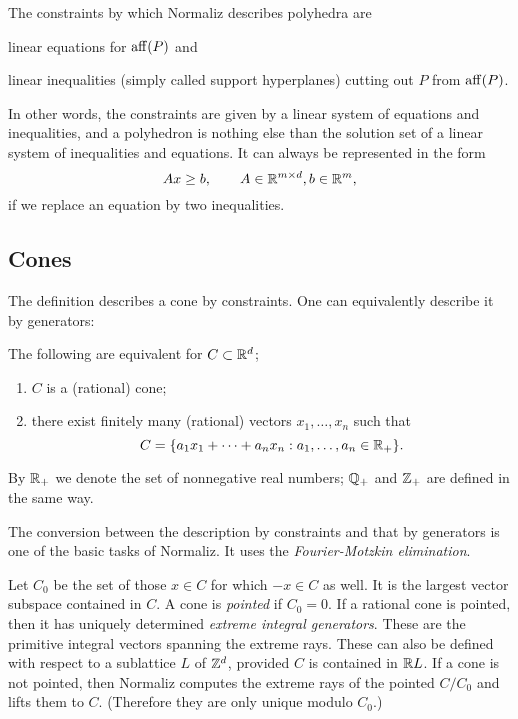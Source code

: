 The constraints by which Normaliz describes polyhedra are
\begin{arab}
	\item linear equations for $\operatorname{aff}(P)$ and
	\item linear inequalities (simply called support hyperplanes) cutting out $P$ from $\operatorname{aff}(P)$.
\end{arab}
In other words, the constraints are given by a linear system of equations and inequalities, and a polyhedron is nothing else than the solution set of a linear system of inequalities and equations. It can always be represented in the form
$$
Ax\ge b, \qquad A\in{\mathbb R}^{m\times d}, b\in {\mathbb R}^m,
$$
if we replace an equation by two inequalities.

\subsection{Cones}

The definition describes a cone by constraints. One can equivalently describe it by generators:

\begin{theorem}
	The following are equivalent for $C\subset{\mathbb R}^d$;
	\begin{enumerate}
		\item $C$ is a (rational) cone;
		\item there exist finitely many (rational) vectors $x_1,\dots,x_n$ such that
		$$
		C=\{a_1x_1+\dots+a_nx_n:a_1,\dots,a_n\in{\mathbb R}_+\}.
		$$
	\end{enumerate}
\end{theorem}

By ${\mathbb R}_+$ we denote the set of nonnegative real numbers; ${\mathbb Q}_+$ and ${\mathbb Z}_+$ are defined in the same way.

The conversion between the description by constraints and that by generators is one of the basic tasks of Normaliz. It uses the \emph{Fourier-Motzkin elimination}.

Let $C_0$ be the set of those $x\in C$ for which $-x\in C$ as well. It is the largest vector subspace contained in $C$.
A cone is \emph{pointed} if $C_0=0$. If a rational cone is pointed, then it has uniquely determined \emph{extreme integral generators}. These are the primitive integral vectors spanning the extreme rays. These can also be defined with respect to a sublattice $L$ of ${\mathbb Z}^d$, provided $C$ is contained in ${\mathbb R} L$. If a cone is not pointed, then Normaliz computes the extreme rays of the pointed $C/C_0$ and lifts them to $C$. (Therefore they are only unique modulo $C_0$.)

